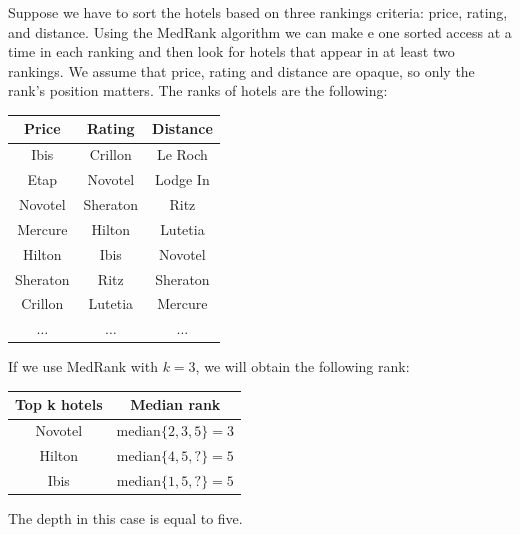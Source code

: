 \documentclass[12pt, a4paper]{report}
\newtheorem[style=M,bodystyle=\normalfont]{theorem}{Theorem}
\newtheorem[style=M,bodystyle=\normalfont]{corollary}{Corollary}
\newtheorem[style=M,bodystyle=\normalfont]{lemma}{Lemma}
\newtheorem[style=M,bodystyle=\normalfont]{definition}{Definition}
\begin{document}
    \begin{example}
        Suppose we have to sort the hotels based on three rankings criteria: price, rating, and distance. Using the MedRank algorithm we can make e one sorted access at a time in 
        each ranking and then look for hotels that appear in at least two rankings. We assume that price, rating and distance are opaque, so only the rank's position matters. The 
        ranks of hotels are the following:
        \begin{table}[H]
            \centering
            \begin{tabular}{c|c|c}
            \textbf{Price} & \textbf{Rating} & \textbf{Distance} \\ \hline
            Ibis           & Crillon         & Le Roch           \\
            Etap           & Novotel         & Lodge In          \\
            Novotel        & Sheraton        & Ritz              \\
            Mercure        & Hilton          & Lutetia           \\
            Hilton         & Ibis            & Novotel           \\
            Sheraton       & Ritz            & Sheraton          \\
            Crillon        & Lutetia         & Mercure           \\
            $\dots$        & $\dots$         & $\dots$          
            \end{tabular}
        \end{table}
        If we use MedRank with $k=3$, we will obtain the following rank: 
        \begin{table}[H]
            \centering
            \begin{tabular}{cc}
            \hline
            \textbf{Top k hotels}       & \textbf{Median rank}          \\ \hline
            Novotel                     & median$\{2,3,5\}=3$           \\ 
            Hilton                      & median$\{4,5,?\}=5$           \\ 
            Ibis                        & median$\{1,5,?\}=5$           \\ \hline
            \end{tabular}
        \end{table}
        The depth in this case is equal to five. 
    \end{example}
\end{document}
